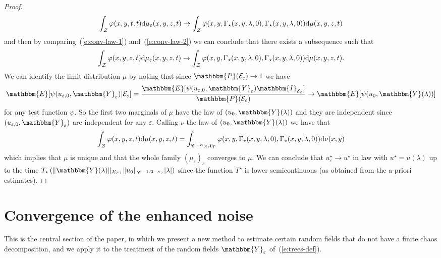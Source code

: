 \begin{proof}
  \begin{equation}
    \int_{\mathcal{Z}} \varphi (x, y, t, t) \mathrm{d} \mu_{\varepsilon} (x, y, z,
    t) \rightarrow \int_{\mathcal{Z}} \varphi (x, y, \Gamma_{\star} (x, y,
    \lambda, 0), \Gamma_{\star} (x, y, \lambda, 0)) \mathrm{d} \mu (x, y, z, t)
    \label{e:conv-law-2}
  \end{equation}
  and then by comparing~(\ref{e:conv-law-1}) and~(\ref{e:conv-law-2}) we can
  conclude that there exists a subsequence such that
  \[ \int_{\mathcal{Z}} \varphi (x, y, z, t) \mathrm{d} \mu_{\varepsilon} (x, y,
     z, t) \rightarrow \int_{\mathcal{Z}} \varphi (x, y, \Gamma_{\star} (x, y,
     \lambda, 0), \Gamma_{\star} (x, y, \lambda, 0)) \mathrm{d} \mu (x, y, z, t) .
  \]
  We can identify the limit distribution $\mu$ by noting that since
  $\mathbbm{P} (\mathcal{E}_{\varepsilon}) \rightarrow 1$ we have
  \[ \mathbbm{E} [\psi (u_{\varepsilon, 0}, \mathbbm{Y}_{\varepsilon})
     |\mathcal{E}_{\varepsilon}] = \frac{\mathbbm{E} [\psi (u_{\varepsilon,
     0}, \mathbbm{Y}_{\varepsilon})
     \mathbbm{I}_{\mathcal{E}_{\varepsilon}}]}{\mathbbm{P}
     (\mathcal{E}_{\varepsilon})} \rightarrow \mathbbm{E} [\psi (u_0,
     \mathbbm{Y} (\lambda))] \]
  for any test function $\psi$. So the first two marginals of $\mu$ have the
  law of $(u_0, \mathbbm{Y} (\lambda))$ and they are independent since
  $(u_{\varepsilon, 0}, \mathbbm{Y}_{\varepsilon})$ are independent for any
  $\varepsilon$. Calling $\nu$ the law of $(u_0, \mathbbm{Y} (\lambda))$ we
  have that
  \[ \int_{\mathcal{Z}} \varphi (x, y, z, t) \mathrm{d} \mu (x, y, z, t) =
     \int_{\mathscr{C} \hspace{.1em}^{- \alpha} \times \mathcal{X}_T} \varphi (x, y, \Gamma_{\star}
     (x, y, \lambda, 0), \Gamma_{\star} (x, y, \lambda, 0)) \mathrm{d} \nu_{} (x,
     y) \]
  which implies that $\mu$ is unique and that the whole family
  $(\mu_{\varepsilon})_{\varepsilon}$ converges to $\mu$. We can conclude that
  $u^{\star}_{\varepsilon} \rightarrow u^{\star}$ in law with $u^{\star} = u
  (\lambda)$ up to the time $T_{\star} \left( \| \mathbbm{Y} (\lambda)
  \|_{\mathcal{X}_T}, \| u_0 \|_{\CC^{- 1 / 2 - \kappa}}, | \lambda | \right)$
  since the function $T^{\star}$ is lower semicontinuous (as obtained from the
  a-priori estimates).
\end{proof}

\section{\label{s:comparing}Convergence of the enhanced noise}

This is the central section of the paper, in which we present a new method to
estimate certain random fields that do not have a finite chaos decomposition,
and we apply it to the treatment of the random fields
$\mathbbm{Y}_{\varepsilon}$ of~(\ref{e:trees-def}).


